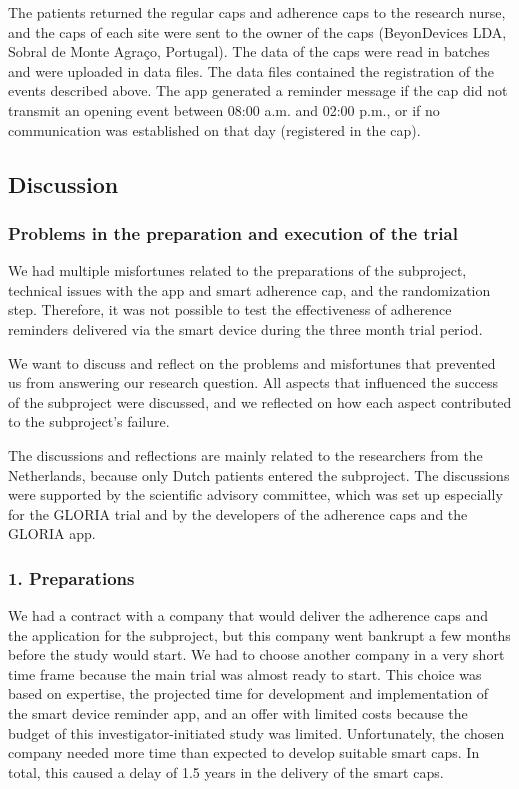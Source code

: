 \documentclass{article}
\begin{document}
The patients returned the regular caps and adherence caps to the research nurse, and the caps of each site were sent to the owner of the caps (BeyonDevices LDA, Sobral de Monte Agraço, Portugal). The data of the caps were read in batches and were uploaded in data files. The data files contained the registration of the events described above. The app generated a reminder message if the cap did not transmit an opening event between 08:00 a.m. and 02:00 p.m., or if no communication was established on that day (registered in the cap). 



\subsection{Discussion}



\subsubsection{Problems in the preparation and execution of the trial}

We had multiple misfortunes related to the preparations of the subproject, technical issues with the app and smart adherence cap, and the randomization step. Therefore, it was not possible to test the effectiveness of adherence reminders delivered via the smart device during the three month trial period. 



We want to discuss and reflect on the problems and misfortunes that prevented us from answering our research question. All aspects that influenced the success of the subproject were discussed, and we reflected on how each aspect contributed to the subproject's failure. 

The discussions and reflections are mainly related to the researchers from the Netherlands, because only Dutch patients entered the subproject. The discussions were supported by the scientific advisory committee, which was set up especially for the GLORIA trial and by the developers of the adherence caps and the GLORIA app.



\subsubsection{1. Preparations}

We had a contract with a company that would deliver the adherence caps and the application for the subproject, but this company went bankrupt a few months before the study would start. We had to choose another company in a very short time frame because the main trial was almost ready to start. This choice was based on expertise, the projected time for development and implementation of the smart device reminder app, and an offer with limited costs because the budget of this investigator-initiated study was limited. Unfortunately, the chosen company needed more time than expected to develop suitable smart caps. In total, this caused a delay of 1.5 years in the delivery of the smart caps.
\end{document}
